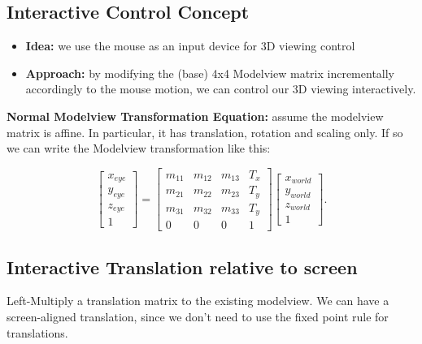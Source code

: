 \documentclass[11pt]{article}
\begin{document}
\subsection{Interactive Control Concept}
\begin{itemize}
    \item \textbf{Idea:} we use the mouse as an input device for 3D viewing control
    \item \textbf{Approach:} by modifying the (base) 4x4 Modelview matrix incrementally accordingly to the mouse motion, we can control our 3D viewing interactively. 
\end{itemize}

\textbf{Normal Modelview Transformation Equation:}  assume the modelview matrix is affine. In particular, it has translation, rotation and scaling only. If so we can write the Modelview transformation like this:

\[
    \begin{bmatrix} x_{eye}\\ y_{eye} \\ z_{eye} \\ 1 \end{bmatrix} = \begin{bmatrix} m_{11} & m_{12} & m_{13} & T_x \\ 
        m_{21} & m_{22} & m_{23} & T_y \\
        m_{31} & m_{32} & m_{33} & T_y \\
        0 & 0 & 0 & 1\end{bmatrix} \begin{bmatrix} x_{world} \\ y_{world} \\ z_{world} \\ 1 \end{bmatrix} 
.\]


\subsection{Interactive Translation relative to screen}
Left-Multiply a translation matrix to the existing modelview. We can have a screen-aligned translation, since we don't need to use the fixed point rule for translations.

\end{document}
